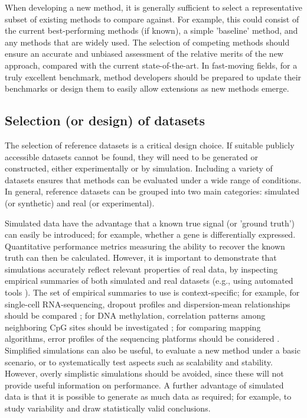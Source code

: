When developing a new method, it is generally sufficient to select a representative subset of existing methods to compare against. For example, this could consist of the current best-performing methods (if known), a simple 'baseline' method, and any methods that are widely used. The selection of competing methods should ensure an accurate and unbiased assessment of the relative merits of the new approach, compared with the current state-of-the-art. In fast-moving fields, for a truly excellent benchmark, method developers should be prepared to update their benchmarks or design them to easily allow extensions as new methods emerge.

\subsection{Selection (or design) of datasets}

The selection of reference datasets is a critical design choice. If suitable publicly accessible datasets cannot be found, they will need to be generated or constructed, either experimentally or by simulation. Including a variety of datasets ensures that methods can be evaluated under a wide range of conditions. In general, reference datasets can be grouped into two main categories: simulated (or synthetic) and real (or experimental).

Simulated data have the advantage that a known true signal (or 'ground truth') can easily be introduced; for example, whether a gene is differentially expressed. Quantitative performance metrics measuring the ability to recover the known truth can then be calculated. However, it is important to demonstrate that simulations accurately reflect relevant properties of real data, by inspecting empirical summaries of both simulated and real datasets (e.g., using automated tools \cite{soneson_unifiedqualityverification_2018}). The set of empirical summaries to use is context-specific; for example, for single-cell RNA-sequencing, dropout profiles and dispersion-mean relationships should be compared \cite{soneson_biasrobustnessscalability_2018}; for DNA methylation, correlation patterns among neighboring CpG sites should be investigated \cite{korthauer_detectionaccuratefalse_2019}; for comparing mapping algorithms, error profiles of the sequencing platforms should be considered \cite{caboche_comparisonmappingalgorithms_2014}. Simplified simulations can also be useful, to evaluate a new method under a basic scenario, or to systematically test aspects such as scalability and stability. However, overly simplistic simulations should be avoided, since these will not provide useful information on performance. A further advantage of simulated data is that it is possible to generate as much data as required; for example, to study variability and draw statistically valid conclusions.

